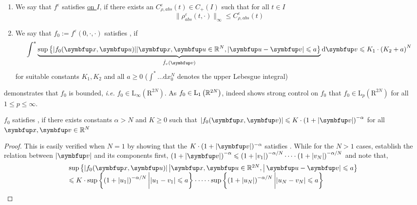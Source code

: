 \begin{lemma}
\begin{assumption}
    \begin{enumerate}
        \item We say that $f^{\varepsilon}$ satisfies \underline{\rhoabs on $I$}, if there exists an $C_{\rho,abs}^{\varepsilon}(t) \in C_{+}(I)$ such that for all $t \in I$
        \begin{equation}
            \label{eq:rhoabs-control}
            \|\rho^{\varepsilon}_{abs}(t, \cdot)\|_{\infty} \leqslant C_{\rho,abs}^{\varepsilon}(t)
        \end{equation}
        \item 
        We say that $f_0:=f^\varepsilon(0,\cdot,\cdot)$ satisfies \underline{\supremumf}, if
        \begin{equation}
            \label{eq:supremum-f0-control}
            \int^*  \underbrace{\sup \left\{|f_0(\vx,\vect{u})| |\vx,\vect{u} \in \bbR^{N}, | \vect{u} - \vv | \leqslant a\right\} }_{\hat{f}_v(\vv)} \mathrm{d} \vv \leqslant K_{1} \cdot\left(K_{2}+a\right)^{N}
        \end{equation}
        for suitable constants $K_{1}, K_{2}$ and all $a \geqslant 0$ ($\int^*  \ldots \mathrm{d} x_{0}^{N}$ denotes the upper Lebesgue integral)
        
    \end{enumerate} 
    
\end{assumption}


\supremumf demonstrates that $f_0$ is bounded, \textit{i.e.} $f_0 \in \mathrm{L}_{\infty}\left(\mathrm{R}^{2 N}\right)$. As $f_0 \in \mathrm{L}_{1}\left({\mathbb{R}}^{2 N}\right)$, 
\supremumf indeed shows strong control on $f_0$ that $f_0 \in \mathrm{L}_{p}\left(\mathrm{R}^{2 N}\right)$ for all $1 \leqslant p \leqslant \infty$.




\begin{lemma}
     $f_0$ satisfies \supremumf, if there exists constants $\alpha>N$ and $K \geqslant 0$ such that $|f_0(\vx,\vv)| \leqslant K \cdot\left(1+\left|\vv\right|\right)^{-\alpha}$ for all $\vx,\vv \in \bbR^{ N}$
\end{lemma}

\begin{proof} This is easily verified when $N=1$ by showing that the $K\cdot (1+|\vv|)^{-\alpha}$ satisfies \supremumf. While for the $N>1$ cases, establish the relation between $|\vv|$ and its components first,
$
\left(1+\left| \vv \right|\right)^{-\alpha} \leqslant\left(1+\left|v_1\right|\right)^{-\alpha / N} \cdots \cdot\left(1+\left|v_{N}\right|\right)^{-\alpha / N}
$
and note that,
\[
\begin{array}{l}
\sup \left\{|f_0(\vx, \vect{u})|\left| \vx, \vect{u} \in \bbR^{2 N},\right| \vect{u}-\vv | \leqslant a\right\} \\
\leqslant K \cdot \sup \left\{\left(1+\left|u_{1}\right|\right)^{-\alpha / N}\bigg| | u_{1}-v_{1} | \leqslant a\right\} 
\cdot\cdots\cdot \sup \left\{\left(1+\left|u_{N}\right|\right)^{-\alpha / N}\bigg| | u_{N}-v_{N} | \leqslant a \right\}
\end{array}
\]


\end{proof}
\end{lemma}
